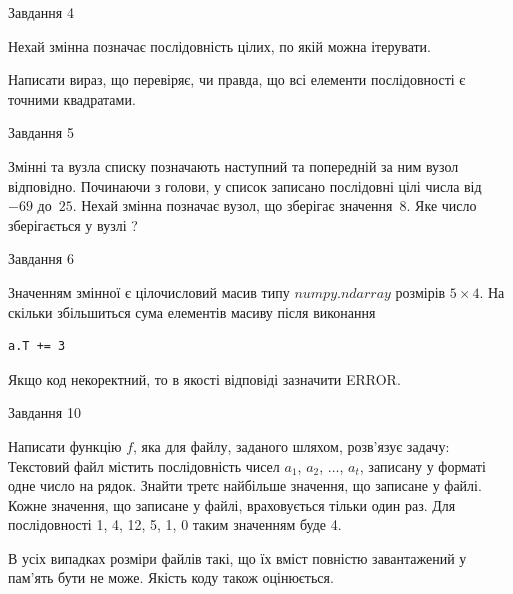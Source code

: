 \documentclass[12pt, ukrainian]{article}
\begin{document}
{               
{\begin{center}Завдання {4}\end{center}}
\vspace{-6mm}
Нехай змінна  позначає послідовність цілих, по якій можна ітерувати.

Написати вираз, що перевіряє, чи правда, що всі елементи послідовності є точними квадратами.\par

\vspace{10mm}
               
{\begin{center}Завдання {5}\end{center}}
\vspace{-6mm}
Змінні  та  вузла списку позначають наступний та попередній за ним вузол відповідно. Починаючи з голови, у список записано послідовні цілі числа від~$-69$ до~$25$. Нехай змінна  позначає вузол, що зберігає значення~$8$.
Яке число зберігається у вузлі  ?\par

               
{\begin{center}Завдання {6}\end{center}}
\vspace{-6mm}
Значенням змінної  є цілочисловий масив типу $numpy.ndarray$ розмірів $5{\times}4$. На скільки збільшиться сума елементів масиву  після виконання
\begin{verbatim}
a.T += 3
\end{verbatim}


Якщо код некоректний, то в якості відповіді зазначити ERROR.\par

               
{\begin{center}Завдання {10}\end{center}}
\vspace{-6mm}

Написати функцію $f$, яка для файлу, заданого шляхом, розв’язує задачу:\\ Текстовий файл містить послідовність чисел $a_1$, $a_2$, $\ldots$, $a_t$, записану у форматі одне число на рядок. Знайти третє найбільше значення, що записане у файлі. Кожне значення, що записане у файлі, враховується тільки один раз. Для послідовності 1, 4, 12, 5, 1, 0 таким значенням буде 4.

В усіх випадках розміри файлів такі, що їх вміст повністю завантажений у пам'ять бути не може. Якість коду також оцінюється.



}
\end{document}

